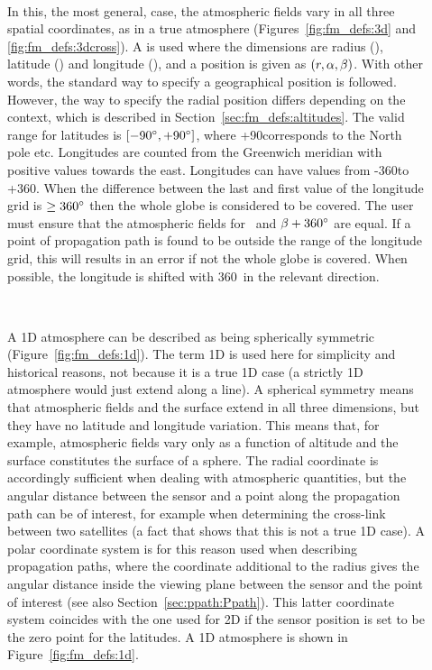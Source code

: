 \begin{description}
  
\item[\,\,\,] In this, the most general, case, the
  atmospheric fields vary in all three spatial coordinates, as in a
  true atmosphere (Figures~\ref{fig:fm_defs:3d} and
  \ref{fig:fm_defs:3dcross}). A  is used where the dimensions are radius (\Rds), latitude
  (\Lat) and longitude (\Lon), and a position is given as
  $(r,\alpha,\beta)$. With other words, the standard way to specify a
  geographical position is followed.  However, the way to specify the
  radial position differs depending on the context, which is described
  in Section~\ref{sec:fm_defs:altitudes}. The valid range for
  latitudes is $[-90^\circ,+90^\circ]$, where +90\degree corresponds
  to the North pole etc. Longitudes are counted from the Greenwich
  meridian with positive values towards the east. Longitudes can have
  values from -360\degree to +360\degree. When the difference between
  the last and first value of the longitude grid is $\geq 360^\circ$
  then the whole globe is considered to be covered. The user must
  ensure that the atmospheric fields for \Lon\ and $\beta+360^\circ$
  are equal. If a point of propagation path is found to be outside the
  range of the longitude grid, this will results in an error if not
  the whole globe is covered. When possible, the longitude is shifted with
  360\degree\ in the relevant direction.
  
\item[\,\,\,] A 1D atmosphere can be described as being
  spherically symmetric (Figure~\ref{fig:fm_defs:1d}). The term 1D is
  used here for simplicity and historical reasons, not because it is a
  true 1D case (a strictly 1D atmosphere would just extend along a
  line). A spherical symmetry means that atmospheric fields and the
  surface extend in all three dimensions, but they have no latitude and
  longitude variation. This means that, for example, atmospheric
  fields vary only as a function of altitude and the surface
  constitutes the surface of a sphere. The radial coordinate is
  accordingly sufficient when dealing with atmospheric quantities, but
  the angular distance between the sensor and a point along the
  propagation path can be of interest, for example when determining
  the cross-link between two satellites (a fact that shows that this
  is not a true 1D case). A polar coordinate system is for this reason
  used when describing propagation paths, where the coordinate
  additional to the radius gives the angular distance inside the
  viewing plane between the sensor and the point of interest (see also
  Section~\ref{sec:ppath:Ppath}). This latter coordinate system
  coincides with the one used for 2D if the sensor position is set to
  be the zero point for the latitudes. A 1D atmosphere is shown in
  Figure~\ref{fig:fm_defs:1d}.
  

\end{description}
